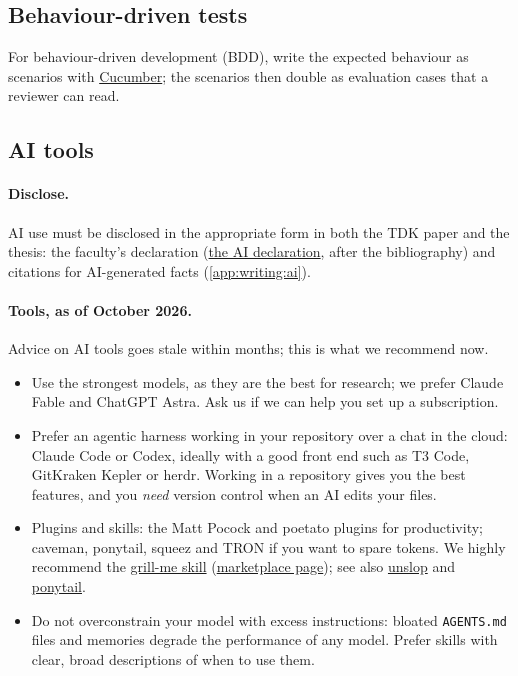 \subsection{Behaviour-driven tests}
For behaviour-driven development (BDD), write the expected behaviour as scenarios with \href{https://cucumber.io/}{Cucumber}; the scenarios then double as evaluation cases that a reviewer can read.

\subsection{AI tools}\label{app:code:ai}
\paragraph{Disclose.} AI use must be disclosed in the appropriate form in both the TDK paper and the thesis: the faculty's declaration (\hyperref[aidecl]{the AI declaration}, after the bibliography) and citations for AI-generated facts (\cref{app:writing:ai}).

\paragraph{Tools, as of October 2026.} Advice on AI tools goes stale within months; this is what we recommend now.
\begin{itemize}
  \item Use the strongest models, as they are the best for research; we prefer Claude Fable and ChatGPT Astra. Ask us if we can help you set up a subscription.
  \item Prefer an agentic harness working in your repository over a chat in the cloud: Claude Code or Codex, ideally with a good front end such as T3 Code, GitKraken Kepler or herdr. Working in a repository gives you the best features, and you \emph{need} version control when an AI edits your files.
  \item Plugins and skills: the Matt Pocock and poetato plugins for productivity; caveman, ponytail, squeez and TRON if you want to spare tokens. We highly recommend the \href{https://www.aihero.dev/skills-grill-me}{grill-me skill} (\href{https://claudemarketplaces.com/skills/mattpocock/skills/grill-me}{marketplace page}); see also \href{https://github.com/cursor/plugins/blob/main/pstack/skills/unslop/SKILL.md}{unslop} and \href{https://github.com/DietrichGebert/ponytail/blob/main/skills/ponytail/SKILL.md}{ponytail}.
  \item Do not overconstrain your model with excess instructions: bloated \texttt{AGENTS.md} files and memories degrade the performance of any model. Prefer skills with clear, broad descriptions of when to use them.
\end{itemize}


